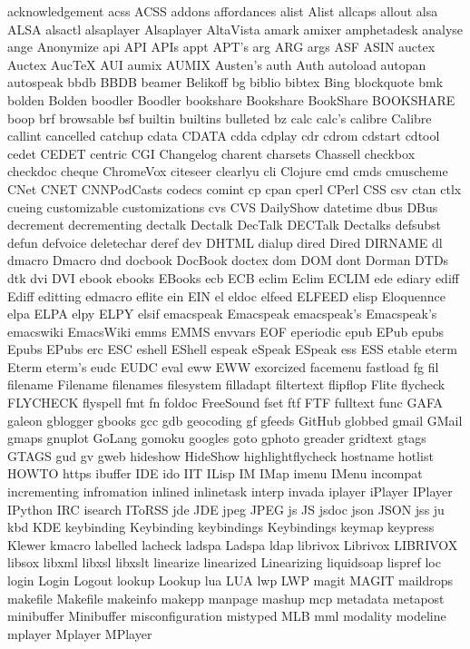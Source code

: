 acknowledgement
acss
ACSS
addons
affordances
alist
Alist
allcaps
allout
alsa
ALSA
alsactl
alsaplayer
Alsaplayer
AltaVista
amark
amixer
amphetadesk
analyse
ange
Anonymize
api
API
APIs
appt
APT's
arg
ARG
args
ASF
ASIN
auctex
Auctex
AucTeX
AUI
aumix
AUMIX
Austen's
auth
Auth
autoload
autopan
autospeak
bbdb
BBDB
beamer
Belikoff
bg
biblio
bibtex
Bing
blockquote
bmk
bolden
Bolden
boodler
Boodler
bookshare
Bookshare
BookShare
BOOKSHARE
boop
brf
browsable
bsf
builtin
builtins
bulleted
bz
calc
calc's
calibre
Calibre
callint
cancelled
catchup
cdata
CDATA
cdda
cdplay
cdr
cdrom
cdstart
cdtool
cedet
CEDET
centric
CGI
Changelog
charent
charsets
Chassell
checkbox
checkdoc
cheque
ChromeVox
citeseer
clearlyu
cli
Clojure
cmd
cmds
cmuscheme
CNet
CNET
CNNPodCasts
codecs
comint
cp
cpan
cperl
CPerl
CSS
csv
ctan
ctlx
cueing
customizable
customizations
cvs
CVS
DailyShow
datetime
dbus
DBus
decrement
decrementing
dectalk
Dectalk
DecTalk
DECTalk
Dectalks
defsubst
defun
defvoice
deletechar
deref
dev
DHTML
dialup
dired
Dired
DIRNAME
dl
dmacro
Dmacro
dnd
docbook
DocBook
doctex
dom
DOM
dont
Dorman
DTDs
dtk
dvi
DVI
ebook
ebooks
EBooks
ecb
ECB
eclim
Eclim
ECLIM
ede
ediary
ediff
Ediff
editting
edmacro
eflite
ein
EIN
el
eldoc
elfeed
ELFEED
elisp
Eloquennce
elpa
ELPA
elpy
ELPY
elsif
emacspeak
Emacspeak
emacspeak's
Emacspeak's
emacswiki
EmacsWiki
emms
EMMS
envvars
EOF
eperiodic
epub
EPub
epubs
Epubs
EPubs
erc
ESC
eshell
EShell
espeak
eSpeak
ESpeak
ess
ESS
etable
eterm
Eterm
eterm's
eudc
EUDC
eval
eww
EWW
exorcized
facemenu
fastload
fg
fil
filename
Filename
filenames
filesystem
filladapt
filtertext
flipflop
Flite
flycheck
FLYCHECK
flyspell
fmt
fn
foldoc
FreeSound
fset
ftf
FTF
fulltext
func
GAFA
galeon
gblogger
gbooks
gcc
gdb
geocoding
gf
gfeeds
GitHub
globbed
gmail
GMail
gmaps
gnuplot
GoLang
gomoku
googles
goto
gphoto
greader
gridtext
gtags
GTAGS
gud
gv
gweb
hideshow
HideShow
highlightflycheck
hostname
hotlist
HOWTO
https
ibuffer
IDE
ido
IIT
ILisp
IM
IMap
imenu
IMenu
incompat
incrementing
infromation
inlined
inlinetask
interp
invada
iplayer
iPlayer
IPlayer
IPython
IRC
isearch
IToRSS
jde
JDE
jpeg
JPEG
js
JS
jsdoc
json
JSON
jss
ju
kbd
KDE
keybinding
Keybinding
keybindings
Keybindings
keymap
keypress
Klewer
kmacro
labelled
lacheck
ladspa
Ladspa
ldap
librivox
Librivox
LIBRIVOX
libsox
libxml
libxsl
libxslt
linearize
linearized
Linearizing
liquidsoap
lispref
loc
login
Login
Logout
lookup
Lookup
lua
LUA
lwp
LWP
magit
MAGIT
maildrops
makefile
Makefile
makeinfo
makepp
manpage
mashup
mcp
metadata
metapost
minibuffer
Minibuffer
misconfiguration
mistyped
MLB
mml
modality
modeline
mplayer
Mplayer
MPlayer
